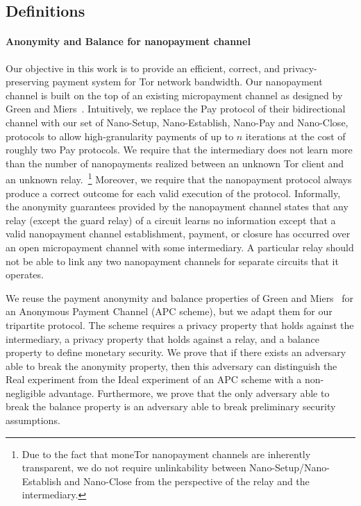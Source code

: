 \subsection{Definitions}

\paragraph*{Anonymity and Balance for nanopayment channel} Our objective in this work is to provide an efficient, correct, and privacy-preserving payment system for Tor network bandwidth.
Our nanopayment channel is built on the top of an existing micropayment channel as designed by Green and Miers~\cite{green2017bolt}.
Intuitively, we replace the Pay protocol of their bidirectional channel with our set of Nano-Setup, Nano-Establish, Nano-Pay and Nano-Close, protocols to allow high-granularity payments of up to $n$ iterations at the cost of roughly two Pay protocols.
We require that the intermediary does not learn more than the number of nanopayments realized between an unknown Tor client and an unknown relay.~\footnote{Due to the fact that moneTor nanopayment channels are inherently transparent, we do not require unlinkability between Nano-Setup/Nano-Establish and Nano-Close from the perspective of the relay and the intermediary.}
Moreover, we require that the nanopayment protocol always produce a correct outcome for each valid execution of the protocol.
Informally, the anonymity guarantees provided by the nanopayment channel states that any relay (except the guard relay) of a circuit learns no information except that a valid nanopayment channel establishment, payment, or closure has occurred over an open micropayment channel with some intermediary.
A particular relay should not be able to link any two nanopayment channels for separate circuits that it operates.

We reuse the payment anonymity and balance properties of Green and Miers~\cite{bolt-eprint} for an Anonymous Payment Channel (APC scheme), but we adapt them for our tripartite protocol.
The scheme requires a privacy property that holds against the intermediary, a privacy property that holds against a relay, and a balance property to define monetary security.
We prove that if there exists an adversary able to break the anonymity property, then this adversary can distinguish the Real experiment from the Ideal experiment of an APC scheme with a non-negligible advantage.
Furthermore, we prove that the only adversary able to break the balance property is an adversary able to break preliminary security assumptions.


